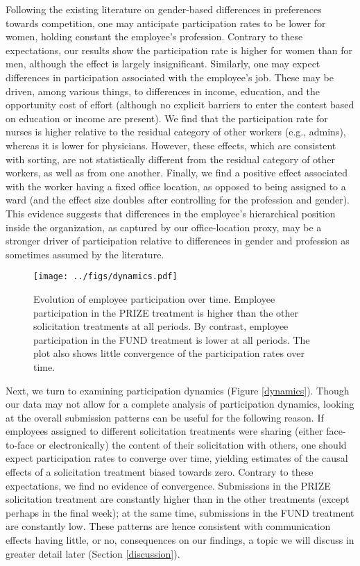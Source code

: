 \documentclass[11pt, titlepage]{article}
\begin{document}
Following the existing literature on gender-based differences in
preferences towards competition, one may anticipate participation rates
to be lower for women, holding constant the employee's profession.
Contrary to these expectations, our results show the participation rate
is higher for women than for men, although the effect is largely
insignificant. Similarly, one may expect differences in participation
associated with the employee's job. These may be driven, among various
things, to differences in income, education, and the opportunity cost of
effort (although no explicit barriers to enter the contest based on
education or income are present). We find that the participation rate
for nurses is higher relative to the residual category of other workers
(e.g., admins), whereas it is lower for physicians. However, these
effects, which are consistent with sorting, are not statistically
different from the residual category of other workers, as well as from
one another. Finally, we find a positive effect associated with the
worker having a fixed office location, as opposed to being assigned to a
ward (and the effect size doubles after controlling for the profession
and gender). This evidence suggests that differences in the employee's
hierarchical position inside the organization, as captured by our
office-location proxy, may be a stronger driver of participation
relative to differences in gender and profession as sometimes assumed by
the literature.

\begin{figure}
\texttt{[image: ../figs/dynamics.pdf]}
\caption{Evolution of employee participation over time. Employee participation in the PRIZE treatment is higher than the other solicitation treatments at all periods. By contrast, employee participation in the FUND treatment is lower at all periods. The plot also shows little convergence of the participation rates over time.}
\end{figure}

Next, we turn to examining participation dynamics (Figure
\ref{dynamics}). Though our data may not allow for a complete analysis
of participation dynamics, looking at the overall submission patterns
can be useful for the following reason. If employees assigned to
different solicitation treatments were sharing (either face-to-face or
electronically) the content of their solicitation with others, one
should expect participation rates to converge over time, yielding
estimates of the causal effects of a solicitation treatment biased
towards zero. Contrary to these expectations, we find no evidence of
convergence. Submissions in the PRIZE solicitation treatment are
constantly higher than in the other treatments (except perhaps in the
final week); at the same time, submissions in the FUND treatment are
constantly low. These patterns are hence consistent with communication
effects having little, or no, consequences on our findings, a topic we
will discuss in greater detail later (Section \ref{discussion}).
\end{document}
